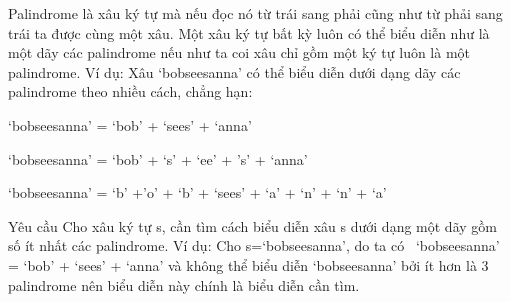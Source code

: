 Palindrome là xâu ký tự mà nếu đọc nó từ trái sang phải cũng như từ phải sang trái ta được cùng một xâu. Một xâu ký tự bất kỳ luôn có thể biểu diễn như là một dãy các palindrome nếu như ta coi xâu chỉ gồm một ký tự luôn là một palindrome. Ví dụ: Xâu ‘bobseesanna’ có thể biểu diễn dưới dạng dãy các palindrome theo nhiều cách, chẳng hạn:  

   ‘bobseesanna’ = ‘bob’ + ‘sees’ + ‘anna’  

   ‘bobseesanna’ = ‘bob’ + ‘s’ + ‘ee’ + ’s’ + ‘anna’  

   ‘bobseesanna’ = ‘b’ +’o’ + ‘b’ + ‘sees’ + ‘a’ + ‘n’ + ‘n’ + ‘a’  

Yêu cầu
Cho xâu ký tự s, cần tìm cách biểu diễn xâu s dưới dạng một dãy gồm số ít nhất các palindrome. Ví dụ: Cho s=‘bobseesanna’, do ta có  ‘bobseesanna’ = ‘bob’ + ‘sees’ + ‘anna’ và không thể biểu diễn ‘bobseesanna’ bởi ít hơn là 3 palindrome nên biểu diễn này chính là biểu diễn cần tìm.